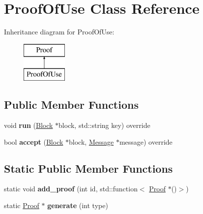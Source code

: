 \hypertarget{classProofOfUse}{}\section{Proof\+Of\+Use Class Reference}
\label{classProofOfUse}
Inheritance diagram for Proof\+Of\+Use\+:\begin{figure}[H]
\begin{center}
\leavevmode
\includegraphics[height=2.000000cm]{classProofOfUse}
\end{center}
\end{figure}
\subsection*{Public Member Functions}
\begin{DoxyCompactItemize}
\item 
\mbox{\label{classProofOfUse_a0673ae91f48264a85cb45e55d88e16b7}} 
void {\bfseries run} (\mbox{\hyperlink{classBlock}{Block}} $\ast$block, std\+::string key) override
\item 
\mbox{\label{classProofOfUse_aad52f30c49109a8714181de0aaab8789}} 
bool {\bfseries accept} (\mbox{\hyperlink{classBlock}{Block}} $\ast$block, \mbox{\hyperlink{classMessage}{Message}} $\ast$message) override
\end{DoxyCompactItemize}
\subsection*{Static Public Member Functions}
\begin{DoxyCompactItemize}
\item 
\mbox{\label{classProof_a93208e5161d25f8533849ac2dac8d6b8}} 
static void {\bfseries add\+\_\+proof} (int id, std\+::function$<$ \mbox{\hyperlink{classProof}{Proof}} $\ast$()$>$)
\item 
\mbox{\label{classProof_a267f0f4587babb59884b5f280e2d54c8}} 
static \mbox{\hyperlink{classProof}{Proof}} $\ast$ {\bfseries generate} (int type)
\end{DoxyCompactItemize}
